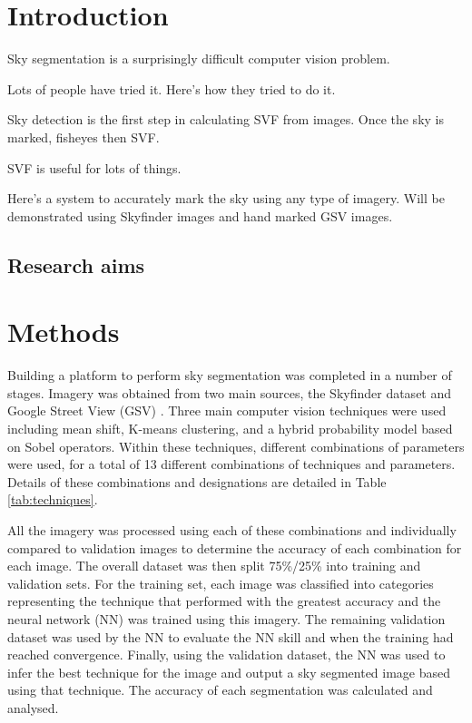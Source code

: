 \documentclass[final,3p,times,authoryear]{elsarticle}
\begin{document}
\section{Introduction}\label{sec:introduction}

Sky segmentation is a surprisingly difficult computer vision problem. 

Lots of people have tried it. Here's how they tried to do it.

Sky detection is the first step in calculating SVF from images. Once the sky is marked, fisheyes then SVF.

SVF is useful for lots of things.

Here's a system to accurately mark the sky using any type of imagery. Will be demonstrated using Skyfinder images and hand marked GSV images.


\subsection{Research aims}





\section{Methods}\label{sec:Methods}

Building a platform to perform sky segmentation was completed in a number of stages. Imagery was obtained from two main sources, the Skyfinder dataset \citep{Mihail2016} and Google Street View (GSV) \citep{GoogleMaps2017b}. Three main computer vision techniques were used including mean shift, K-means clustering, and a hybrid probability model based on Sobel operators. Within these techniques, different combinations of parameters were used, for a total of 13 different combinations of techniques and parameters. Details of these combinations and designations are detailed in Table \ref{tab:techniques}.

All the imagery was processed using each of these combinations and individually compared to validation images to determine the accuracy of each combination for each image. The overall dataset was then split 75\%/25\% into training and validation sets. For the training set, each image was classified into categories representing the technique that performed with the greatest accuracy and the neural network (NN) was trained using this imagery. The remaining validation dataset was used by the NN to evaluate the NN skill and when the training had reached convergence. Finally, using the validation dataset, the NN was used to infer the best technique for the image and output a sky segmented image based using that technique. The accuracy of each segmentation was calculated and analysed. 
\end{document}
